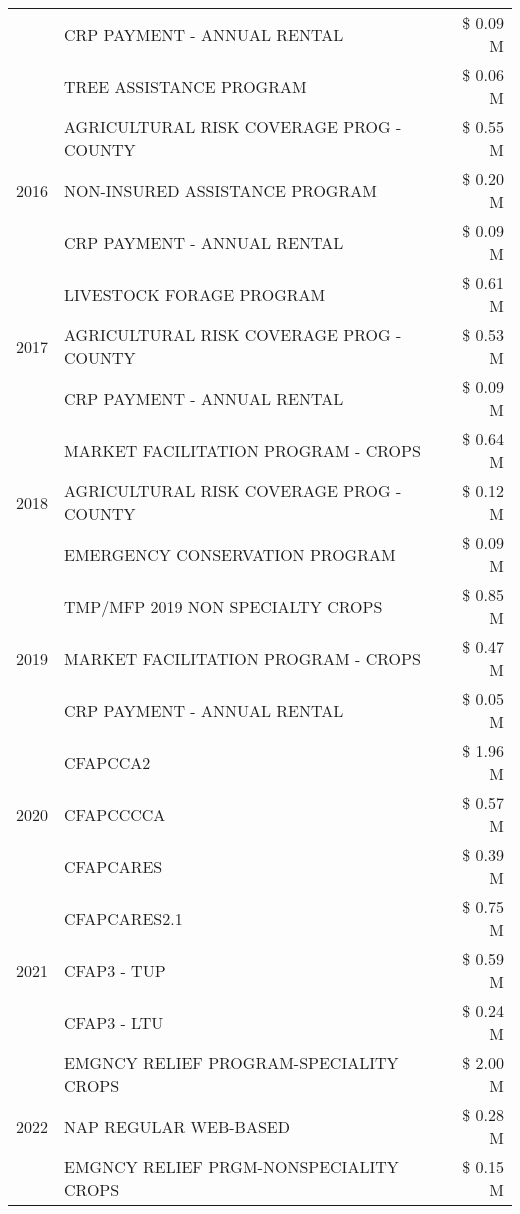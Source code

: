 \begin{tabular}{llr}
 & CRP PAYMENT - ANNUAL RENTAL & \$ 0.09 M \\
 & TREE ASSISTANCE PROGRAM & \$ 0.06 M \\
\cline{1-3}
\multirow[t]{3}{*}{2016} & AGRICULTURAL RISK COVERAGE PROG - COUNTY & \$ 0.55 M \\
 & NON-INSURED ASSISTANCE PROGRAM & \$ 0.20 M \\
 & CRP PAYMENT - ANNUAL RENTAL & \$ 0.09 M \\
\cline{1-3}
\multirow[t]{3}{*}{2017} & LIVESTOCK FORAGE PROGRAM & \$ 0.61 M \\
 & AGRICULTURAL RISK COVERAGE PROG - COUNTY & \$ 0.53 M \\
 & CRP PAYMENT - ANNUAL RENTAL & \$ 0.09 M \\
\cline{1-3}
\multirow[t]{3}{*}{2018} & MARKET FACILITATION PROGRAM - CROPS & \$ 0.64 M \\
 & AGRICULTURAL RISK COVERAGE PROG - COUNTY & \$ 0.12 M \\
 & EMERGENCY CONSERVATION PROGRAM & \$ 0.09 M \\
\cline{1-3}
\multirow[t]{3}{*}{2019} & TMP/MFP 2019 NON SPECIALTY CROPS & \$ 0.85 M \\
 & MARKET FACILITATION PROGRAM - CROPS & \$ 0.47 M \\
 & CRP PAYMENT - ANNUAL RENTAL & \$ 0.05 M \\
\cline{1-3}
\multirow[t]{3}{*}{2020} & CFAPCCA2 & \$ 1.96 M \\
 & CFAPCCCCA & \$ 0.57 M \\
 & CFAPCARES & \$ 0.39 M \\
\cline{1-3}
\multirow[t]{3}{*}{2021} & CFAPCARES2.1 & \$ 0.75 M \\
 & CFAP3 - TUP & \$ 0.59 M \\
 & CFAP3 - LTU & \$ 0.24 M \\
\cline{1-3}
\multirow[t]{3}{*}{2022} & EMGNCY RELIEF PROGRAM-SPECIALITY CROPS & \$ 2.00 M \\
 & NAP REGULAR WEB-BASED & \$ 0.28 M \\
 & EMGNCY RELIEF PRGM-NONSPECIALITY CROPS & \$ 0.15 M \\
\cline{1-3}
\bottomrule
\end{tabular}
